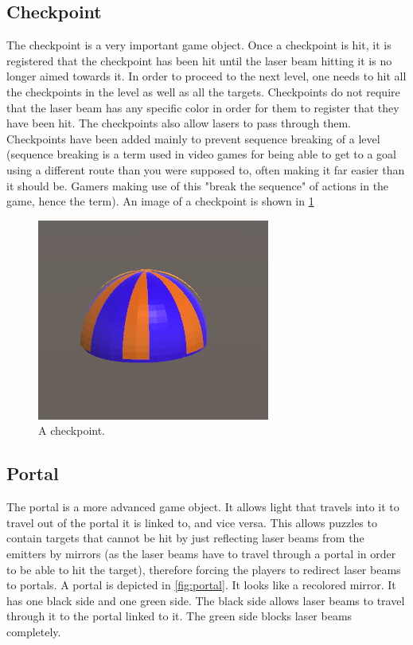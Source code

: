		\subsection{Checkpoint}
			The checkpoint is a very important game object. Once a checkpoint is
			hit, it is registered that the checkpoint has been hit until the
			laser beam hitting it is no longer aimed towards it. In order to
			proceed to the next level, one needs to hit all the checkpoints
			in the level as well as all the targets. Checkpoints do not require
			that the laser beam has any specific color in order for them to register
			that they have been hit. The checkpoints also allow lasers to pass
			through them. Checkpoints have been added mainly to prevent sequence
			breaking of a level (sequence breaking is a term used in video games
			for being able to get to a goal using a different route than you were
			supposed to, often making it far easier than it should be. Gamers making
			use of this "break the sequence" of actions in the game, hence the term).
			An image of a checkpoint is shown in \ref{fig:checkpoint}
			\begin{figure}[!ht]
				\centering
				\includegraphics[scale = 0.5]{Checkpoint}
				\caption{A checkpoint.}
				\label{fig:checkpoint}
			\end{figure}
			
		\subsection{Portal} \label{ssec:portal}
			The portal is a more advanced game object. It allows light that travels 
			into it to travel out of the portal it is linked to, and vice versa. This
			allows puzzles to contain targets that cannot be hit by just reflecting
			laser beams from the emitters by mirrors (as the laser beams have to
			travel through a portal in order to be able to hit the target),
			therefore forcing the players to redirect laser beams to portals.
			A portal is depicted in \ref{fig:portal}. It looks like a 
			recolored mirror. It has one black side and one green side. The 
			black side allows laser beams to travel through it to the portal linked to 
			it. The green side blocks laser beams completely.
			
